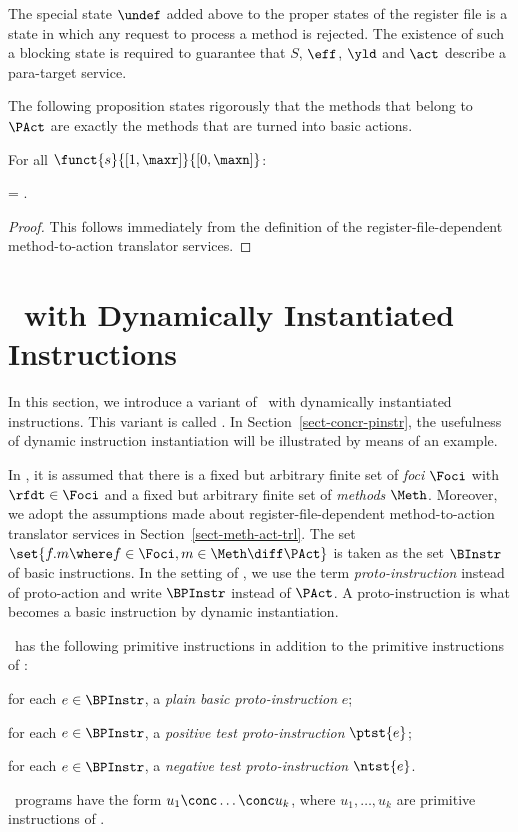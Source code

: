 \documentclass[fleqn]{llncs}
\begin{document}
The special state $\undef$ added above to the proper states of the
register file is a state in which any request to process a method is
rejected.
The existence of such a blocking state is required to guarantee that
$S$, $\eff$, $\yld$ and $\act$ describe a para-target service.

The following proposition states rigorously that the methods that belong
to $\PAct$ are exactly the methods that are turned into basic actions.
\begin{proposition}
For all $\funct{s}{[1,\maxr]}{[0,\maxn]}$:
\begin{ldispl}
\PAct =
 \;.
\end{ldispl}\end{proposition}
\begin{proof}
This follows immediately from the definition of the
register-file-dependent method-to-action translator services.
\end{proof}

\section{\PGLD\ with Dynamically Instantiated Instructions}
\label{sect-PGLDdii}

In this section, we introduce a variant of \PGLD\ with dynamically
instantiated instructions.
This variant is called \PGLDdii.
In Section~\ref{sect-concr-pinstr}, the usefulness of dynamic
instruction instantiation will be illustrated by means of an example.

In \PGLDdii, it is assumed that there is a fixed but arbitrary finite set
of \emph{foci} $\Foci$ with $\rfdt \in \Foci$ and a fixed but arbitrary
finite set of \emph{methods} $\Meth$.
Moreover, we adopt the assumptions made about register-file-dependent
method-to-action translator services in Section~\ref{sect-meth-act-trl}.
The set $\set{f.m \where f \in \Foci, m \in \Meth \diff \PAct}$ is taken
as the set $\BInstr$ of basic instructions.
In the setting of \PGLDdii, we use the term \emph{proto-instruction}
instead of proto-action and write $\BPInstr$ instead of $\PAct$.
A proto-instruction is what becomes a basic instruction by dynamic
instantiation.

\PGLDdii\ has the following primitive instructions in addition to the
primitive instructions of \PGLD:
\begin{iteml}
\item
for each $e \in \BPInstr$, a \emph{plain basic proto-instruction} $e$;
\item
for each $e \in \BPInstr$, a \emph{positive test proto-instruction}
$\ptst{e}$;
\item
for each $e \in \BPInstr$, a \emph{negative test proto-instruction}
$\ntst{e}$.
\end{iteml}
\PGLDdii\ programs have the form $u_1 \conc \ldots \conc u_k$, where
$u_1,\ldots,u_k$ are primitive instructions of \PGLDdii.
\end{document}
